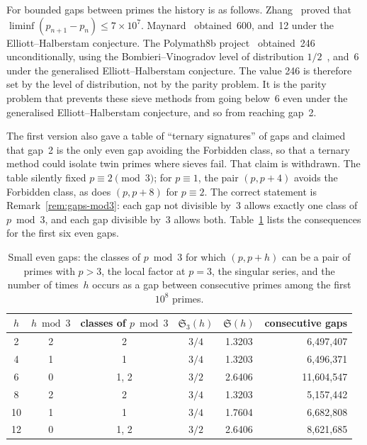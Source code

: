 \documentclass[12pt,a4paper]{article}
\theoremstyle{plain}
\theoremstyle{definition}
\theoremstyle{remark}
\begin{document}
For bounded gaps between primes the history is as follows. Zhang~\cite{Zha14} proved
that $\liminf (p_{n+1} - p_n) \leq 7 \times 10^7$. Maynard~\cite{May15} obtained~600,
and~12 under the Elliott--Halberstam conjecture. The Polymath8b
project~\cite{Pol14} obtained~246 unconditionally, using the Bombieri--Vinogradov level of
distribution $1/2$~\cite{Bom65, Vin65}, and~6 under the generalised Elliott--Halberstam
conjecture. The value 246 is therefore set by the level of distribution, not by the
parity problem. It is the parity problem that prevents these sieve methods from going
below~6 even under the generalised Elliott--Halberstam conjecture, and so from reaching
gap~2.

The first version also gave a table of ``ternary signatures'' of gaps and claimed that
gap~2 is the only even gap avoiding the Forbidden class, so that a ternary method could
isolate twin primes where sieves fail. That claim is withdrawn. The table silently fixed
$p \equiv 2 \pmod 3$; for $p \equiv 1$, the pair $(p, p+4)$ avoids the Forbidden class,
as does $(p, p+8)$ for $p \equiv 2$. The correct statement is
Remark~\ref{rem:gaps-mod3}: each gap not divisible by~3 allows exactly one class of
$p \bmod 3$, and each gap divisible by~3 allows both. Table~\ref{tab:gaps} lists the
consequences for the first six even gaps.

\begin{table}[htbp]
\centering
\caption{Small even gaps: the classes of $p \bmod 3$ for which $(p, p+h)$ can be a pair
of primes with $p > 3$, the local factor at $p = 3$, the singular series, and the number
of times~$h$ occurs as a gap between consecutive primes among the first $10^8$
primes.}
\label{tab:gaps}
\renewcommand{\arraystretch}{1.2}
\begin{tabular}{cccccr}
\toprule
$h$ & $h \bmod 3$ & classes of $p \bmod 3$ & $\mathfrak{S}_3(h)$ & $\mathfrak{S}(h)$ &
consecutive gaps \\
\midrule
2  & 2 & 2    & $3/4$ & 1.3203 & 6{,}497{,}407 \\
4  & 1 & 1    & $3/4$ & 1.3203 & 6{,}496{,}371 \\
6  & 0 & 1, 2 & $3/2$ & 2.6406 & 11{,}604{,}547 \\
8  & 2 & 2    & $3/4$ & 1.3203 & 5{,}157{,}442 \\
10 & 1 & 1    & $3/4$ & 1.7604 & 6{,}682{,}808 \\
12 & 0 & 1, 2 & $3/2$ & 2.6406 & 8{,}621{,}685 \\
\bottomrule
\end{tabular}
\end{table}
\end{document}
